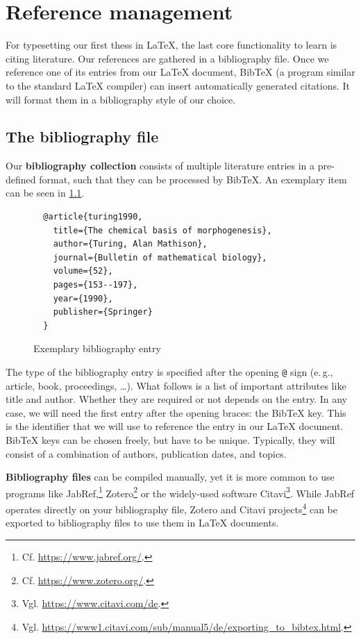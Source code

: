 \chapter{Reference management}
\label{sec:literature}

For typesetting our first thess in \LaTeX{}, the last core functionality to learn is citing literature.
Our references are gathered in a bibliography file.
Once we reference one of its entries from our \LaTeX{} document, Bib\TeX{} (a 
program similar to the standard \LaTeX{} compiler) can insert automatically generated citations.
It will format them in a bibliography style of our choice.

\section{The bibliography file}
Our \textbf{bibliography collection} consists of multiple literature entries in a pre-defined format, such that they can be processed by Bib\TeX{}.
An exemplary item can be seen in \cref{lst:bibfile-sample-entry}.

\begin{figure}[H]
  \begin{verbatim}
  @article{turing1990,
    title={The chemical basis of morphogenesis},
    author={Turing, Alan Mathison},
    journal={Bulletin of mathematical biology},
    volume={52},
    pages={153--197},
    year={1990},
    publisher={Springer}
  }
  \end{verbatim}
  \caption{Exemplary bibliography entry}
  \label{lst:bibfile-sample-entry}
\end{figure}

The type of the bibliography entry is specified after the opening \texttt{@} sign (e.\,g., article, book, proceedings, …).
What follows is a list of important attributes like title and author.
Whether they are required or not depends on the entry.
In any case, we will need the first entry after the opening braces: the Bib\TeX{} key.
This is the identifier that we will use to reference the entry in our \LaTeX{} document.
Bib\TeX{} keys can be chosen freely, but have to be unique.
Typically, they will consist of a combination of authors, publication dates, and topics.

\textbf{Bibliography files} can be compiled manually, yet it is more common to use programs like JabRef,\footnote{Cf. \url{https://www.jabref.org/}.} Zotero\footnote{Cf. \url{https://www.zotero.org/}.} or the widely-used software Citavi\footnote{Vgl. \url{https://www.citavi.com/de}.}.
While JabRef operates directly on your bibliography file, Zotero and Citavi projects\footnote{Vgl. \url{https://www1.citavi.com/sub/manual5/de/exporting_to_bibtex.html}.} can be exported to bibliography files to use them in \LaTeX{} documents.

